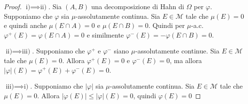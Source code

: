 \begin{proof}
    \(\text{i)} \implies \text{ii)}\). Sia \((A, B)\) una decomposizione di Hahn
    di \(\Omega\) per \(\varphi \). Supponiamo che \(\varphi\) sia
    \(\mu\)-assolutamente continua. Sia \(E \in \mathcal{M}\) tale che
    \(\mu(E) = 0\) e quindi anche \(\mu(E \cap A) = 0\) e \(\mu(E \cap B) = 0\).
    Quindi per \(\mu\)-a.c.~\(\varphi^{+}(E) =
    \varphi(E \cap A) = 0\) e similmente \(\varphi^{-}(E) = -\varphi(E \cap B) = 0\).

    \(\text{ii)} \implies \text{iii)}\). Supponiamo che \(\varphi^{+}\) e
    \(\varphi^{-}\) siano \(\mu\)-assolutamente continue. Sia \(E \in \mathcal{M}\)
    tale che \(\mu(E) = 0\). Allora \(\varphi^{+}(E) = 0\) e \(\varphi^{-}(E) =
    0\), ma allora \(|\varphi|(E) = \varphi^{+}(E) + \varphi^{-}(E) = 0\).

    \(\text{iii)} \implies \text{i)}\). Supponiamo che \(|\varphi|\) sia
    \(\mu\)-assolutamente continua. Sia \(E \in \mathcal{M}\) tale che \(\mu(E) =
    0\). Allora \(|\varphi (E)| \le |\varphi |(E) = 0\), quindi \(\varphi (E) =
    0\) 
\end{proof}


